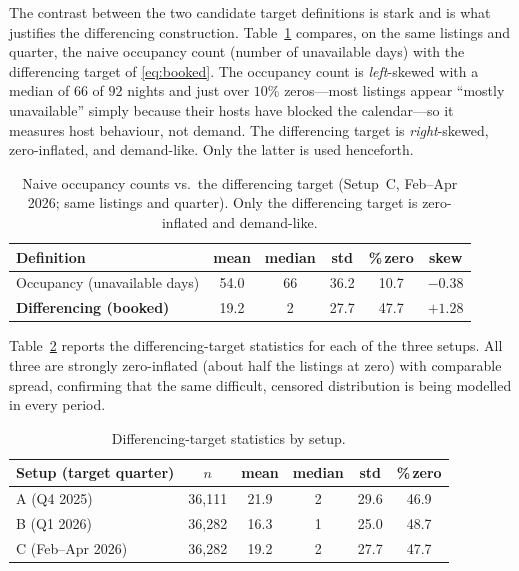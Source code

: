 \documentclass[review,12pt]{elsarticle}
\begin{document}
The contrast between the two candidate target definitions is stark and is what
justifies the differencing construction. Table~\ref{tab:targetdef} compares, on
the same listings and quarter, the naive occupancy count (number of unavailable
days) with the differencing target of \eqref{eq:booked}. The occupancy count is
\emph{left}-skewed with a median of $66$ of $92$ nights and just over $10\%$
zeros---most listings appear ``mostly unavailable'' simply because their hosts
have blocked the calendar---so it measures host behaviour, not demand. The
differencing target is \emph{right}-skewed, zero-inflated, and demand-like. Only
the latter is used henceforth.

\begin{table}[!t]
\caption{Naive occupancy counts vs.\ the differencing target (Setup~C,
Feb--Apr 2026; same listings and quarter). Only the differencing target is
zero-inflated and demand-like.}
\label{tab:targetdef}
\centering
\small
\begin{tabular}{lccccc}
\toprule
Definition & mean & median & std & \%\,zero & skew \\
\midrule
Occupancy (unavailable days) & 54.0 & 66 & 36.2 & 10.7 & $-0.38$ \\
\textbf{Differencing (booked)} & 19.2 & 2 & 27.7 & 47.7 & $+1.28$ \\
\bottomrule
\end{tabular}
\end{table}

Table~\ref{tab:targetstats} reports the differencing-target statistics for each of
the three setups. All three are strongly zero-inflated (about half the listings at
zero) with comparable spread, confirming that the same difficult, censored
distribution is being modelled in every period.

\begin{table}[!t]
\caption{Differencing-target statistics by setup.}
\label{tab:targetstats}
\centering
\small
\begin{tabular}{lccccc}
\toprule
Setup (target quarter) & $n$ & mean & median & std & \%\,zero \\
\midrule
A (Q4 2025) & 36,111 & 21.9 & 2 & 29.6 & 46.9 \\
B (Q1 2026) & 36,282 & 16.3 & 1 & 25.0 & 48.7 \\
C (Feb--Apr 2026) & 36,282 & 19.2 & 2 & 27.7 & 47.7 \\
\bottomrule
\end{tabular}
\end{table}
\end{document}
